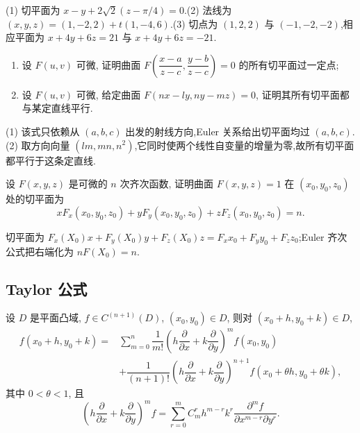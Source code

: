 \begin{solution}
    (1) 切平面为 $x-y+2\sqrt{2}(z-\pi/4)=0$.(2) 法线为 $(x,y,z)=(1,-2,2)+t(1,-4,6)$.(3) 切点为 $(1,2,2)$ 与 $(-1,-2,-2)$,相应平面为 $x+4y+6z=21$ 与 $x+4y+6z=-21$.
\end{solution}

\begin{example}
    \begin{enumerate}
        \item 设 $F(u,v)$ 可微, 证明曲面 $\displaystyle F\left(\dfrac{x-a}{z-c},\dfrac{y-b}{z-c}\right)=0$ 的所有切平面过一定点;
        \item 设 $F(u,v)$ 可微, 给定曲面 $F(nx-ly,ny-mz)=0$, 证明其所有切平面都与某定直线平行.
    \end{enumerate}
\end{example}
\exampleblank

\begin{solution}
    (1) 该式只依赖从 $(a,b,c)$ 出发的射线方向,Euler 关系给出切平面均过 $(a,b,c)$.(2) 取方向向量 $(lm,mn,n^2)$,它同时使两个线性自变量的增量为零,故所有切平面都平行于这条定直线.
\end{solution}

\begin{example}
    设 $F(x,y,z)$ 是可微的 $n$ 次齐次函数, 证明曲面 $F(x,y,z)=1$ 在 $(x_0,y_0,z_0)$ 处的切平面为
    \[
        xF_x(x_0,y_0,z_0)+yF_y(x_0,y_0,z_0)+zF_z(x_0,y_0,z_0)=n.
    \]
\end{example}
\exampleblank

\begin{solution}
    切平面为 $F_x(X_0)x+F_y(X_0)y+F_z(X_0)z=F_xx_0+F_yy_0+F_zz_0$;Euler 齐次公式把右端化为 $nF(X_0)=n$.
\end{solution}



\subsection{Taylor 公式}

\begin{theorem}
    设 $D$ 是平面凸域, $f\in C^{(n+1)}(D)$, $(x_0,y_0)\in D$, 则对 $(x_0+h,y_0+k)\in D$,
    \[
        \begin{aligned}
            f(x_0+h,y_0+k)
            ={} & \sum\limits_{m=0}^n\dfrac{1}{m!}
            \left(h\dfrac{\partial}{\partial x}+k\dfrac{\partial}{\partial y}\right)^m f(x_0,y_0) \\
                & +\dfrac{1}{(n+1)!}
            \left(h\dfrac{\partial}{\partial x}+k\dfrac{\partial}{\partial y}\right)^{n+1}
            f(x_0+\theta h,y_0+\theta k),
        \end{aligned}
    \]
    其中 $0<\theta<1$, 且
    \[
        \left(h\dfrac{\partial}{\partial x}+k\dfrac{\partial}{\partial y}\right)^mf
        =\sum\limits_{r=0}^mC_m^r h^{m-r}k^r
        \dfrac{\partial^mf}{\partial x^{m-r}\partial y^r}.
    \]
\end{theorem}

